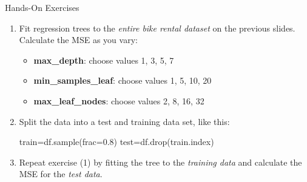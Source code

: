 \documentclass[ignorenonframetext,xcolor=x11names]{beamer}
\begin{document}
\begin{frame}[fragile]{Hands-On Exercises}
\begin{enumerate}
\item Fit regression trees to the \emph{entire bike rental dataset} on the previous slides. Calculate the MSE as you vary:
\begin{itemize}
   \item \textbf{max\_depth}: choose values 1, 3, 5, 7
   \item \textbf{min\_samples\_leaf}: choose values 1, 5, 10, 20
   \item \textbf{max\_leaf\_nodes}: choose values 2, 8, 16, 32
\end{itemize}
\item Split the data into a test and training data set, like this:
\begin{pythoncode}
train=df.sample(frac=0.8)
test=df.drop(train.index)
\end{pythoncode}
\item Repeat exercise (1) by fitting the tree to the \emph{training data} and calculate the MSE for the \emph{test data}.
\end{enumerate}
\end{frame}


\end{document}
